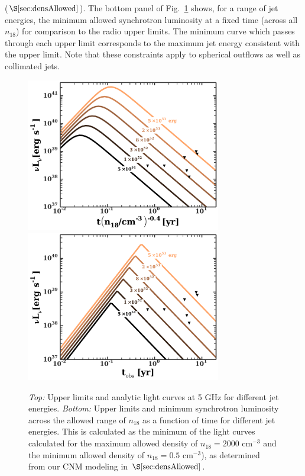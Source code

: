 \documentclass[usenatbib,fleqn]{mnras}
\begin{document}
($\S\ref{sec:densAllowed}$). The bottom panel of
Fig.~\ref{fig:econtours} shows, for a range of jet energies, the
minimum allowed synchrotron luminosity at a fixed time (across all
$n_{18}$) for comparison to the radio upper limits.  The minimum curve
which passes through each upper limit corresponds to the maximum jet
energy consistent with the upper limit.  Note that these constraints
apply to spherical outflows as well as collimated jets.



\begin{figure}
\includegraphics[width=8.5cm]{e_contours1.pdf}
\includegraphics[width=8.5cm]{e_contours2.pdf}
\caption{\label{fig:econtours} {\it Top:} Upper limits and analytic
  light curves at 5 GHz for different jet energies.  {\it Bottom:}
  Upper limits and minimum synchrotron luminosity across the allowed
  range of $n_{18}$ as a function of time for different jet energies.
  This is calculated as the minimum of the light curves calculated for
  the maximum allowed density of $n_{18} = 2000$ cm$^{-3}$ and the
  minimum allowed density of $n_{18}= 0.5$ cm$^{-3}$), as determined
  from our CNM modeling in $\S\ref{sec:densAllowed}$.}
\end{figure}
\end{document}
